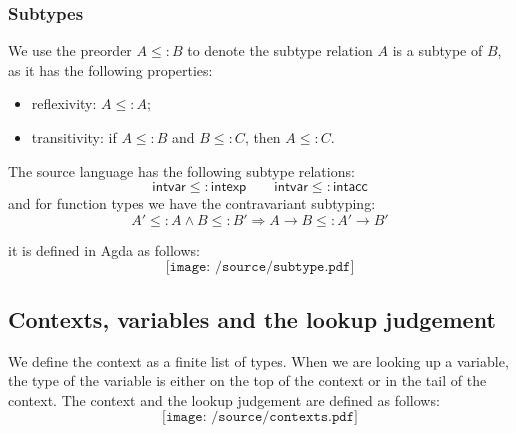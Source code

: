 \documentclass[12pt,twoside,a4paper]{report}
\theoremstyle{definition}
\theoremstyle{definition}
\theoremstyle{definition}
\theoremstyle{definition}
\begin{document}
        \subsubsection{Subtypes}
        We use the preorder $A \leq: B$ to denote the subtype relation $A$ is a subtype of $B$, as it has the following properties:
        \begin{itemize}
            \item 
                reflexivity: $A \leq: A$;
            \item 
                transitivity: if $A \leq: B$ and $B \leq: C$, then $A \leq: C$.
        \end{itemize}

        The source language has the following subtype relations:
        \[ \textsf{intvar} \leq: \textsf{intexp} \qquad \textsf{intvar} \leq: \textsf{intacc} \]
        and for function types we have the contravariant subtyping:
        \[ A' \leq: A \land B \leq: B' \Rightarrow A \to B \leq: A' \to B' \]
        
        it is defined in Agda as follows:
        \[\texttt{[image: /source/subtype.pdf]}\]

        \subsection{Contexts, variables and the lookup judgement}
        We define the context as a finite list of types. When we are looking up a variable, the type of the variable is either on the top of the context or in the tail of the context. The context and the lookup judgement are defined as follows:
        \[\texttt{[image: /source/contexts.pdf]}\]
\end{document}
